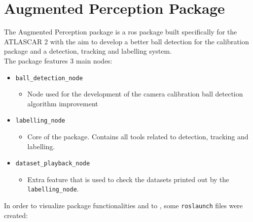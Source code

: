 \chapter{Augmented Perception Package}

The Augmented Perception package is a \gls{ros} package built specifically for the ATLASCAR 2 with the aim to develop a better ball detection for the calibration package and a detection, tracking and labelling system.\\

The package features 3 main nodes:

\begin{itemize}
	\item \texttt{ball\_detection\_node}
	\begin{itemize}
		\item Node used for the development of the camera calibration ball detection algorithm improvement
	\end{itemize}
	\item \texttt{labelling\_node}
	\begin{itemize}
		\item Core of the package. Contains all tools related to detection, tracking and labelling.
	\end{itemize}
	\item \texttt{dataset\_playback\_node}
	\begin{itemize}
		\item Extra feature that is used to check the datasets printed out by the \texttt{labelling\_node}.
	\end{itemize}
\end{itemize}

In order to visualize package functionalities and to , some \texttt{roslaunch} files were created:

